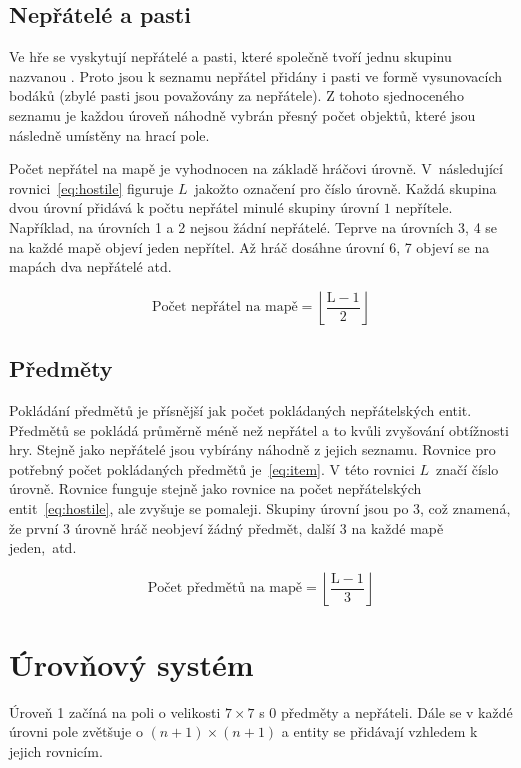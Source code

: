 \subsection*{Nepřátelé a pasti}
Ve hře se vyskytují nepřátelé a pasti, které společně tvoří jednu skupinu nazvanou . Proto jsou k seznamu nepřátel přidány i pasti ve formě vysunovacích bodáků (zbylé pasti jsou považovány za nepřátele). Z tohoto sjednoceného seznamu je každou úroveň náhodně vybrán přesný počet objektů, které jsou následně umístěny na hrací pole.

Počet nepřátel na mapě je vyhodnocen na základě hráčovi úrovně. V~následující rovnici~\ref{eq:hostile} figuruje $L$~jakožto označení pro číslo úrovně. Každá skupina dvou úrovní přidává k počtu nepřátel minulé skupiny úrovní $1$ nepřítele. Například, na úrovních 1 a 2 nejsou žádní nepřátelé. Teprve na úrovních 3, 4 se na každé mapě objeví jeden nepřítel. Až hráč dosáhne úrovní 6, 7 objeví se na mapách dva nepřátelé atd.

\begin{equation}
    \text{Počet nepřátel na mapě} = \left\lfloor \frac{\text{L} - 1}{2} \right\rfloor
\label{eq:hostile}
\end{equation}

\subsection*{Předměty}
Pokládání předmětů je přísnější jak počet pokládaných nepřátelských entit. Předmětů se pokládá průměrně méně než nepřátel a to kvůli zvyšování obtížnosti hry. Stejně jako nepřátelé jsou vybírány náhodně z jejich seznamu. Rovnice pro potřebný počet pokládaných předmětů je~\ref{eq:item}. V této rovnici $L$~značí číslo úrovně. Rovnice funguje stejně jako rovnice na počet nepřátelských entit~\ref{eq:hostile}, ale zvyšuje se pomaleji. Skupiny úrovní jsou po 3, což znamená, že první 3 úrovně hráč neobjeví žádný předmět, další 3 na každé mapě jeden,~atd.

\begin{equation}
    \text{Počet předmětů na mapě} = \left\lfloor \frac{\text{L} - 1}{3} \right\rfloor
\label{eq:item}
\end{equation}

\section{Úrovňový systém}
Úroveň 1 začíná na poli o velikosti $7 \times 7$ s 0 předměty a nepřáteli. Dále se v každé úrovni pole zvětšuje o $(n + 1) \times (n + 1)$ a entity se přidávají vzhledem k jejich rovnicím.


